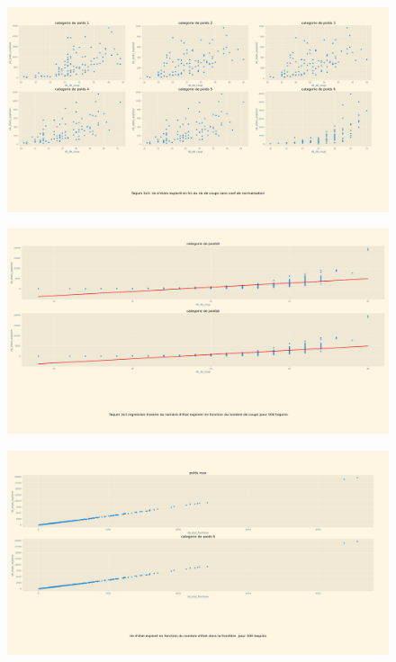 \documentclass[a4paper, 12pt]{article}
\begin{document}
\begin{figure}[H]
    \centering
    \includegraphics[width=\textwidth]{Taquin 3x3 nombre d'etat explorer en fct du nb de coups sans coef}
\end{figure}
\begin{figure}[H]
    \centering
    \includegraphics[width=\textwidth]{Taquin 3x3 nombre d'etat explorer en fct du nb de coups}
\end{figure}
\begin{figure}[H]
    \centering
    \includegraphics[width=\textwidth]{Taquin 3x3 nombre d'etat explorer en fct du nb de detat dans la frontiere}
\end{figure}
\end{document}

